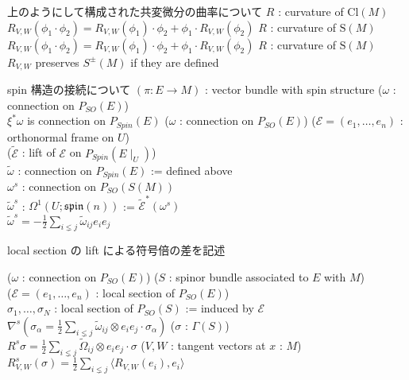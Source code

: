 \begin{Theorem}
\itemnote
  上のようにして構成された共変微分の曲率について
\itemprop
  \For \(R\) : curvature of \(\text{Cl}(M)\) \\
  \Then \(R_{V , W} (\phi_1 \cdot \phi_2) = R_{V , W} (\phi_1) \cdot \phi_2 + \phi_1 \cdot R_{V , W}(\phi_2)\)
\itemprop
  \For \(R\) : curvature of \(\text{S}(M)\) \\
  \Then \(R_{V , W} (\phi_1 \cdot \phi_2) = R_{V , W} (\phi_1) \cdot \phi_2 + \phi_1 \cdot R_{V , W}(\phi_2)\)
\itemprop
  \For \(R\) : curvature of \(\text{S}(M)\) \\
  \Then \(R_{V , W}\) preserves \(S^{\pm}(M)\) if they are defined
\end{Theorem}

\begin{Theorem}
\itemnote
  spin 構造の接続について
\itemwhen
  \Fix \((\pi : E \to M)\) : vector bundle with spin structure
\itemprop
  \For (\(\omega\) : connection on \(P_{SO}(E)\)) \\
  \Then \(\xi^*\omega\) is connection on \(P_{Spin}(E)\)
\itemprop
  \For (\(\omega\) : connection on \(P_{SO}(E)\)) (\(\mathcal{E} = (e_1 , \ldots , e_n)\) : orthonormal frame on \(U\)) \\
  \For (\(\tilde{\mathcal{E}}\) : lift of \(\mathcal{E}\) on \(P_{Spin}(E \mid _{U})\)) \\
  \Let \(\tilde{\omega}\) : connection on \(P_{Spin}(E)\) := defined above \\
  \For \(\omega^s\) : connection on \(P_{SO}(S(M))\) \\
  \Let \(\tilde{\omega}^s\) : \(\Omega^1(U ; \mathfrak{spin}(n))\) := \(\tilde{\mathcal{E}}^*(\omega^s)\) \\
  \Then \(\tilde{\omega}^s = -\frac{1}{2}\sum_{i \lneq j} \tilde{\omega}_{ij} e_i e_j\)
\end{Theorem}

\begin{Theorem}
\itemnote
  local section の lift による符号倍の差を記述
\itemprop
  \WIP
\end{Theorem}

\begin{Theorem}
\itemprop
  \For (\(\omega\) : connection on \(P_{SO}(E)\)) (\(S\) : spinor bundle associated to \(E\) with \(M\)) \\
  \For (\(\mathcal{E} = (e_1 , \ldots , e_n)\) : local section of \(P_{SO}(E)\)) \\
  \Let \(\sigma_1 , \ldots , \sigma_N\) : local section of \(P_{SO}(S)\) := induced by \(\mathcal{E}\) \\
  \Then \(\nabla^s (\sigma_{\alpha} = \frac{1}{2}\sum_{i \lneq j} \tilde{\omega}_{ij} \otimes e_i e_j \cdot \sigma_{\alpha})\)
\itemprop
  \For (\(\sigma\) : \(\Gamma(S)\)) \\
  \Then \(R^s \sigma = \frac{1}{2}\sum_{i \lneq j} \tilde{\Omega}_{ij} \otimes e_i e_j \cdot \sigma\)
\itemprop
  \For (\(V , W\) : tangent vectors at \(x\) : \(M\)) \\
  \Then \(R_{V , W}^s(\sigma) = \frac{1}{2}\sum_{i \lneq j}\langle R_{V , W}(e_i) , e_i \rangle \)
\end{Theorem}

